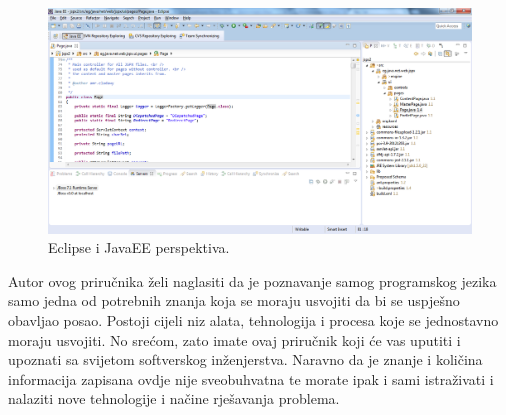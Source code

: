 \begin{figure}[h!]
    \caption{Eclipse i JavaEE perspektiva.}
    \label{fig:eclipse_overview}
    \centering
    \includegraphics[max width=\textwidth]{images/eclipse_overview.png}
\end{figure}

\begin{infobox}
    Autor ovog priručnika želi naglasiti da je poznavanje samog programskog jezika samo jedna od potrebnih znanja koja se moraju usvojiti da bi se uspješno obavljao posao. Postoji cijeli niz alata, tehnologija i procesa koje se jednostavno moraju usvojiti. No srećom, zato imate ovaj priručnik koji će vas uputiti i upoznati sa svijetom softverskog inženjerstva. Naravno da je znanje i količina informacija zapisana ovdje nije sveobuhvatna te morate ipak i sami istraživati i nalaziti nove tehnologije i načine rješavanja problema.
\end{infobox}